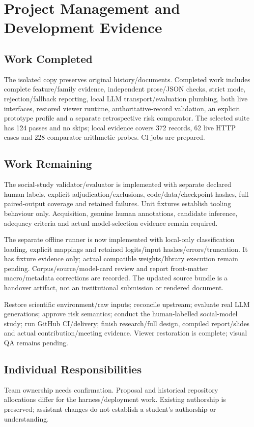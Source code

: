 \chapter{Project Management and Development Evidence}
\section{Work Completed}
The isolated copy preserves original history/documents. Completed work includes complete feature/family evidence, independent prose/JSON checks, strict mode, rejection/fallback reporting, local LLM transport/evaluation plumbing, both live interfaces, restored viewer runtime, authoritative-record validation, an explicit prototype profile and a separate retrospective risk comparator. The selected suite has 124 passes and no skips; local evidence covers 372 records, 62 live HTTP cases and 228 comparator arithmetic probes. CI jobs are prepared.
\section{Work Remaining}
The social-study validator/evaluator is implemented with separate declared human labels, explicit adjudication/exclusions, code/data/checkpoint hashes, full paired-output coverage and retained failures. Unit fixtures establish tooling behaviour only. Acquisition, genuine human annotations, candidate inference, adequacy criteria and actual model-selection evidence remain required.

The separate offline runner is now implemented with local-only classification loading, explicit mappings and retained logits/input hashes/errors/truncation. It has fixture evidence only; actual compatible weights/library execution remain pending. Corpus/source/model-card review and report front-matter macro/metadata corrections are recorded. The updated source bundle is a handover artifact, not an institutional submission or rendered document.

Restore scientific environment/raw inputs; reconcile upstream; evaluate real LLM generations; approve risk semantics; conduct the human-labelled social-model study; run GitHub CI/delivery; finish research/full design, compiled report/slides and actual contribution/meeting evidence. Viewer restoration is complete; visual QA remains pending.
\section{Individual Responsibilities}
Team ownership needs confirmation. Proposal and historical repository allocations differ for the harness/deployment work. Existing authorship is preserved; assistant changes do not establish a student's authorship or understanding.
